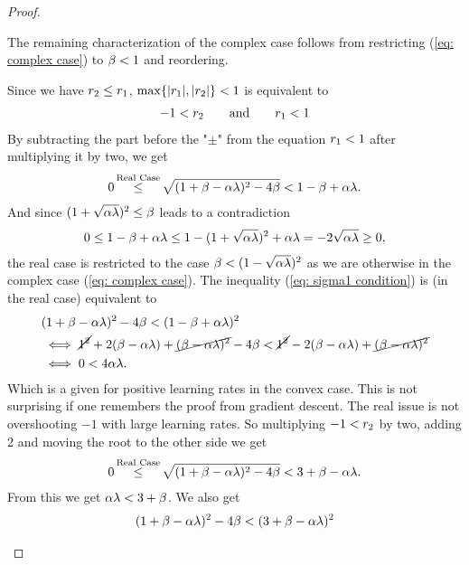 \begin{proof}
\begin{description}[wide, labelindent=0pt]
		The remaining characterization of the complex case follows from
		restricting (\ref{eq: complex case}) to \(\beta<1\) and reordering.
		\item[Real Case:] Since we have \(r_2 \le r_1\),
		\(\max\{|r_1|,|r_2|\}<1\) is equivalent to
		\begin{align*}
			-1 < r_2 \qquad \text{and} \qquad r_1 < 1
		\end{align*}
		By subtracting the part before the "\(\pm\)" from the equation \(r_1<1\)
		after multiplying it by two, we get
		\begin{align}\label{eq: sigma1 condition}
			0\xle{\text{Real Case}} \sqrt{(1+\momCoeff-\lrSq\hesseEV)^2 -4\momCoeff} < 1-\momCoeff +\lrSq\hesseEV.
		\end{align}
		And since \((1+\sqrt{\alpha\lambda})^2 \le \beta\) leads to a contradiction
		\begin{align*}
			0 \le 1-\beta+\alpha\lambda \le 1-(1+\sqrt{\alpha\lambda})^2 +\alpha\lambda
			= -2\sqrt{\alpha\lambda} \ge 0,
		\end{align*}
		the real case is restricted to the case \(\beta < (1-\sqrt{\alpha\lambda})^2\)
		as we are otherwise in the complex case (\ref{eq: complex case}).
		The inequality (\ref{eq: sigma1 condition}) is (in the real case) equivalent to
		\begin{align*}
			&(1+\beta-\alpha\lambda)^2 - 4\beta < (1-\beta+\alpha\lambda)^2\\
			&\iff \cancel{1^2} + 2(\beta-\alpha\lambda) + 
			\cancel{(\beta-\alpha\lambda)^2} - 4\beta
			< \cancel{1^2} - 2(\beta-\alpha\lambda) + 
			\cancel{(\beta-\alpha\lambda)^2}\\
			&\iff 0 < 4\alpha\lambda.
		\end{align*}
		Which is a given for positive learning rates in the convex	
		case. This is not surprising if one remembers the proof from gradient
		descent. The real issue is not overshooting \(-1\) with large learning
		rates. So multiplying \(-1<r_2\) by two, adding 2 and moving the
		root to the other side we get
		\begin{align}\label{eq: from -1<sigma_2 followed}
			0 \xle{\text{Real Case}} \sqrt{(1+\momCoeff-\lrSq\hesseEV)^2 - 4\momCoeff}
			< 3+\momCoeff-\lrSq\hesseEV.
		\end{align}
		From this we get \(\alpha\lambda < 3+\beta\). We also get
		\begin{align}
			\nonumber
			&(1+\momCoeff-\lrSq\hesseEV)^2 - 4\momCoeff < (3+\momCoeff-\lrSq\hesseEV)^2\\

\end{align}
\end{description}
\end{proof}
